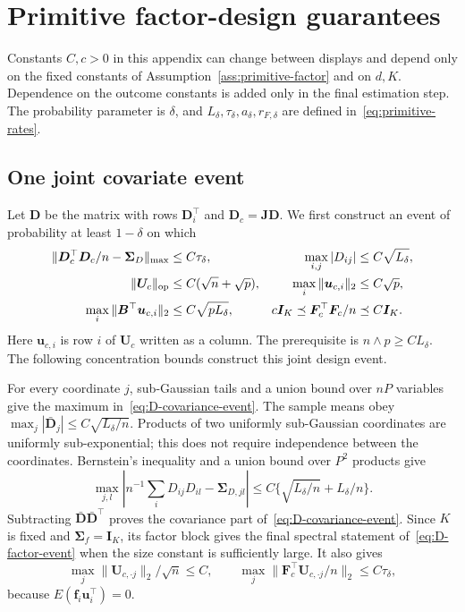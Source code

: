 \section{Primitive factor-design guarantees}
\label{app:pca-proof}
Constants $C,c>0$ in this appendix can change between displays and depend only on the fixed constants of Assumption~\ref{ass:primitive-factor} and on $d,K$. Dependence on the outcome constants is added only in the final estimation step. The probability parameter is $\delta$, and $L_\delta,\tau_\delta,a_\delta,r_{F,\delta}$ are defined in~\eqref{eq:primitive-rates}.

\subsection{One joint covariate event}
\label{subapp:primitive-concentration}
Let $\bm{D}$ be the matrix with rows $\bm{D}_i^\top$ and $\bm{D}_c=\bm{J}\bm{D}$. We first construct an event of probability at least $1-\delta$ on which
\begin{align}
 \|\bm{D}_c^\top \bm{D}_c/n-\bm{\Sigma}_D\|_{\max}&\le C\tau_\delta,
 &\max_{i,j}|D_{ij}|&\le C\sqrt{L_\delta}, \label{eq:D-covariance-event}\\
 \|\bm{U}_c\|_{\rm op}&\le C(\sqrt n+\sqrt p),
 &\max_i\|\bm{u}_{c,i}\|_2&\le C\sqrt p, \label{eq:D-noise-event}\\
 \max_i\|\bm{B}^\top \bm{u}_{c,i}\|_2&\le C\sqrt{pL_\delta},
 &c\bm{I}_K\preceq \bm{F}_c^\top \bm{F}_c/n&\preceq C\bm{I}_K. \label{eq:D-factor-event}
\end{align}
Here $\bm{u}_{c,i}$ is row $i$ of $\bm{U}_c$ written as a column. The prerequisite is $n\wedge p\ge CL_\delta$. The following concentration bounds construct this joint design event.

For every coordinate $j$, sub-Gaussian tails and a union bound over $nP$ variables give the maximum in~\eqref{eq:D-covariance-event}. The sample means obey $\max_j|\bar{\bm{D}}_j|\le C\sqrt{L_\delta/n}$. Products of two uniformly sub-Gaussian coordinates are uniformly sub-exponential; this does not require independence between the coordinates. Bernstein's inequality and a union bound over $P^2$ products give
\[
 \max_{j,l}|n^{-1}\sum_iD_{ij}D_{il}-\bm{\Sigma}_{D,jl}|
 \le C\{\sqrt{L_\delta/n}+L_\delta/n\}.
\]
Subtracting $\bar{\bm{D}}\bar{\bm{D}}^\top$ proves the covariance part of~\eqref{eq:D-covariance-event}. Since $K$ is fixed and $\bm{\Sigma}_f=\bm{I}_K$, its factor block gives the final spectral statement of~\eqref{eq:D-factor-event} when the size constant is sufficiently large. It also gives
\begin{equation}
 \max_j\|\bm{U}_{c,\cdot j}\|_2/\sqrt n\le C,
 \qquad \max_j\|\bm{F}_c^\top \bm{U}_{c,\cdot j}/n\|_2\le C\tau_\delta,
 \label{eq:D-column-crosscov}
\end{equation}
because $E(\bm{f}_i\bm{u}_i^\top)=0$.


